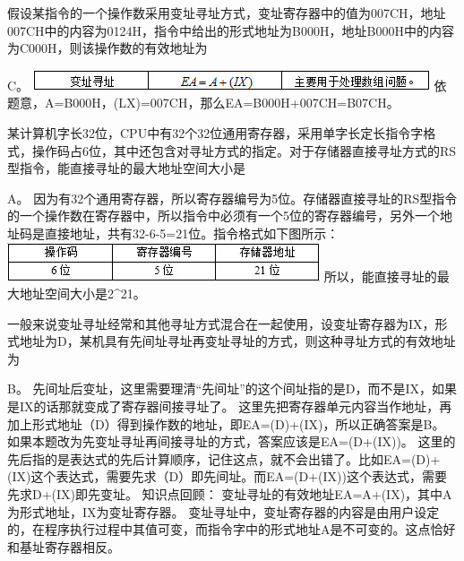 \question 假设某指令的一个操作数采用变址寻址方式，变址寄存器中的值为007CH，地址007CH中的内容为0124H，指令中给出的形式地址为B000H，地址B000H中的内容为C000H，则该操作数的有效地址为
\par{}
\begin{solution}C。
\includegraphics[width=4.61458in,height=0.23958in]{computerassets/42915143abc5fc9d27b6626825afca7e.jpeg}
依题意，A=B000H，(LX)=007CH，那么EA=B000H+007CH=B07CH。
\end{solution}
\question 某计算机字长32位，CPU中有32个32位通用寄存器，采用单字长定长指令字格式，操作码占6位，其中还包含对寻址方式的指定。对于存储器直接寻址方式的RS型指令，能直接寻址的最大地址空间大小是
\par{}
\begin{solution}A。
因为有32个通用寄存器，所以寄存器编号为5位。存储器直接寻址的RS型指令的一个操作数在寄存器中，所以指令中必须有一个5位的寄存器编号，另外一个地址码是直接地址，共有32-6-5=21位。指令格式如下图所示：
\includegraphics[width=3.63542in,height=0.44792in]{computerassets/f59d9d0e012ea401c6f7b94b23fae953.jpeg}
所以，能直接寻址的最大地址空间大小是2\^{}21。
\end{solution}
\question 一般来说变址寻址经常和其他寻址方式混合在一起使用，设变址寄存器为IX，形式地址为D，某机具有先间址寻址再变址寻址的方式，则这种寻址方式的有效地址为
\par{}
\begin{solution}B。
先间址后变址，这里需要理清``先间址''的这个间址指的是D，而不是IX，如果是IX的话那就变成了寄存器间接寻址了。
这里先把寄存器单元内容当作地址，再加上形式地址（D）得到操作数的地址，即EA=(D)+(IX)，所以正确答案是B。
如果本题改为先变址寻址再间接寻址的方式，答案应该是EA=(D+(IX))。
这里的先后指的是表达式的先后计算顺序，记住这点，就不会出错了。比如EA=(D)+(IX)这个表达式，需要先求（D）即先间址。而EA=(D+(IX))这个表达式，需要先求D+(IX)即先变址。
知识点回顾：
变址寻址的有效地址EA=A+(IX)，其中A为形式地址，IX为变址寄存器。
变址寻址中，变址寄存器的内容是由用户设定的，在程序执行过程中其值可变，而指令字中的形式地址A是不可变的。这点恰好和基址寄存器相反。
\end{solution}
